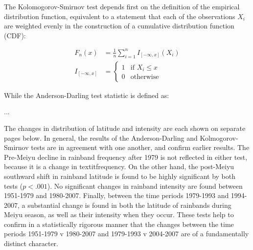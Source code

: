 The Kolomogorov-Smirnov test depends first on the definition of the empirical distribution function, equivalent to a statement that each of the observations $X_i$ are weighted evenly in the construction of a cumulative distribution function (CDF):

\begin{align}
	
	F_n(x) &= \frac{1}{n}\sum_{i=1}^n I_{[-\infty,x]} (X_i) \\
	I_{[-\infty,x]} &=
	\begin{cases}
   		 1 & \text{if } X_i \leq x\\
    		0 & \text{otherwise}
    	\end{cases}

\end{align}

While the Anderson-Darling test statistic is defined as:

...

The changes in distribution of latitude and intensity are each shown on separate pages below. In general, the results of the Anderson-Darling and Kolmogorov-Smirnov tests are in agreement with one another, and confirm earlier results. The Pre-Meiyu decline in rainband frequency after 1979 is not reflected in either test, because it is a change in textit{frequency}. On the other hand, the post-Meiyu southward shift in rainband latitude is found to be highly significant by both tests ($p<.001$). No significant changes in rainband intensity are found between 1951-1979 and 1980-2007. Finally, between the time periods 1979-1993 and 1994-2007, a substantial change is found in both the latitude of rainbands during Meiyu season, as well as their intensity when they occur. These tests help to confirm in a statistically rigorous manner that the changes between the time periods 1951-1979 v 1980-2007 and 1979-1993 v 2004-2007 are of a fundamentally distinct character.

